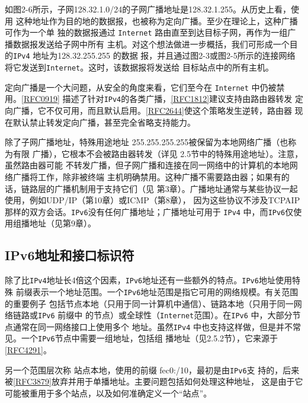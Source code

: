 如图2-6所示，子网128.32.1.0/24的子网广播地址是128.32.1.255。从历史上看，使用
这种地址作为目的地的数据报，也被称为定向广播。至少在理论上，这种广播可作为一个单
独的数据报通过 \verb|Internet| 路由直至到达目标子网，再作为一组广播数据报发送给子网中所有
主机。对这个想法做进一步概括，我们可形成一个目的\verb|IPv4| 地址为128.32.255.255 的数据
报，并且通过图2-3或图2-5所示的连接网络将它发送到\verb|Internet|。这时，该数据报将发送给
目标站点中的所有主机。

\begin{tcolorbox}
    定向广播是一个大问题，从安全的角度来看，它们至今在 \verb|Internet| 中仍被禁
    用。\href{https://www.rfc-editor.org/rfc/rfc0919}{[RFC0919]} 描述了针对\verb|IPv4|的各类广播，\href{https://www.rfc-editor.org/rfc/rfc1812}{[RFC1812]}建议支持由路由器转发
    定向广播，它不仅可用，而且默认启用。\href{https://www.rfc-editor.org/rfc/rfc2644}{[RFC2644]}使这个策略发生逆转，路由器
    现在默认禁止转发定向广播，甚至完全省略支持能力。
\end{tcolorbox}

除了子网广播地址，特殊用途地址 255.255.255.255被保留为本地网络广播（也称为有限
广播），它根本不会被路由器转发（详见 2.5节中的特殊用途地址）。注意，虽然路由器可能
不转发广播，但子网广播和连接在同一网络中的计算机的本地网络广播将工作，除非被终端
主机明确禁用。这种广播不需要路由器；如果有的话，链路层的广播机制用于支持它们（见
第3章）。广播地址通常与某些协议一起使用，例如UDP/IP（第10章）或ICMP（第8章），
因为这些协议不涉及TCPAIP 那样的双方会话。\verb|IPv6|没有任何广播地址；广播地址可用于
\verb|IPv4| 中，而\verb|IPv6|仅使用组播地址（见第9章）。

\subsection{IPv6地址和接口标识符}
除了比\verb|IPv4|地址长4倍这个因素，\verb|IPv6|地址还有一些额外的特点。\verb|IPv6|地址使用特殊
前缀表示一个地址范围。一个\verb|IPv6|地址范围是指它可用的网络规模。有关范围的重要例子
包括节点本地（只用于同一计算机中通信）、链路本地（只用于同一网络链路或\verb|IPv6| 前缀中
的节点）或全球性（\verb|Internet|范围）。在\verb|IPv6| 中，大部分节点通常在同一网络接口上使用多个
地址。虽然\verb|IPv4| 中也支持这样做，但是并不常见。一个\verb|IPv6|节点中需要一组地址，包括组
播地址（见2.5.2节），它来源于\href{https://www.rfc-editor.org/rfc/rfc4291}{[RFC4291]}。
 
\begin{tcolorbox}
    另一个范围层次称 站点本地，使用的前缀 fec0:/10，最初是由\verb|IPv6|支
    持的，后来被\href{https://www.rfc-editor.org/rfc/rfc3879}{[RFC3879]}放弃并用于单播地址。主要问题包括如何处理这种地址，
    这是由于它可能被重用于多个站点，以及如何准确定义一个“站点”。
\end{tcolorbox}

